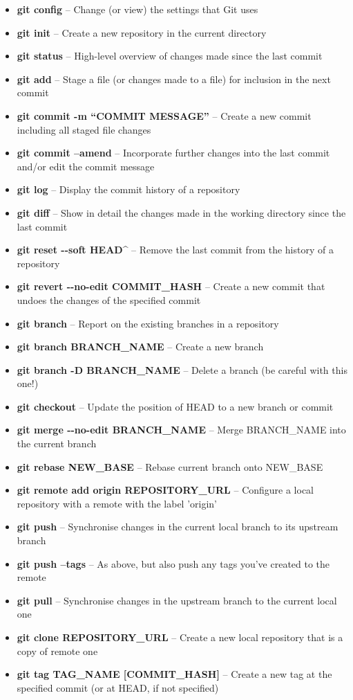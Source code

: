 \documentclass[9pt]{extarticle}
\def\itempad{-1pt}
\begin{document}
\begin{bluebox}[title=Git Command Cheat Sheet]
  \begin{itemize}
    \itemsep\itempad
  \item \textbf{git config} -- Change (or view) the settings that Git uses
  \item \textbf{git init} -- Create a new repository in the current directory
  \item \textbf{git status} -- High-level overview of changes made since the last commit
  \item \textbf{git add} -- Stage a file (or changes made to a file) for inclusion in
    the next commit
  \item \textbf{git commit -m ``COMMIT MESSAGE''} -- Create a new commit including all
    staged file changes
  \item \textbf{git commit --amend} -- Incorporate further changes into the last commit
    and/or edit the commit message
  \item \textbf{git log} -- Display the commit history of a repository
  \item \textbf{git diff} -- Show in detail the changes made in the working directory
    since the last commit
  \item \textbf{git reset -{}-soft HEAD\^} -- Remove the last commit from the history of
    a repository
  \item \textbf{git revert -{}-no-edit COMMIT\_HASH} -- Create a new commit that undoes
    the changes of the specified commit
  \item \textbf{git branch} -- Report on the existing branches in a repository
  \item \textbf{git branch BRANCH\_NAME} -- Create a new branch
  \item \textbf{git branch -D BRANCH\_NAME} -- Delete a branch (be careful with this one!)
  \item \textbf{git checkout} -- Update the position of HEAD to a new branch or commit
  \item \textbf{git merge -{}-no-edit BRANCH\_NAME} -- Merge BRANCH\_NAME into the
    current branch
  \item \textbf{git rebase NEW\_BASE} -- Rebase current branch onto NEW\_BASE
  \item \textbf{git remote add origin REPOSITORY\_URL} -- Configure a local repository
    with a remote with the label 'origin'
  \item \textbf{git push} -- Synchronise changes in the current local branch to its
    upstream branch
  \item \textbf{git push --tags} -- As above, but also push any tags you've created to
    the remote
  \item \textbf{git pull} -- Synchronise changes in the upstream branch to the current
    local one
  \item \textbf{git clone REPOSITORY\_URL} -- Create a new local repository that is a
    copy of remote one
  \item \textbf{git tag TAG\_NAME [COMMIT\_HASH]} -- Create a new tag at the specified
    commit (or at HEAD, if not specified)
  \end{itemize}
\end{bluebox}


\furtherhelp
\end{document}
